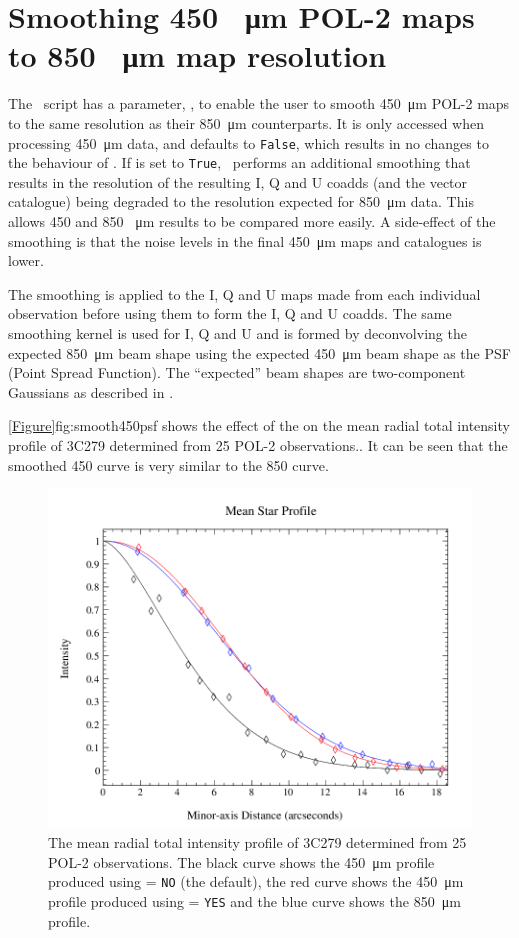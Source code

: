 \section{Smoothing 450 \SI{}{\micro\metre} POL-2 maps to 850 \SI{}{\micro\metre} map resolution}

The \poltwomap\ script has a parameter, , to enable the user to smooth
\SI{450}{\micro\metre} POL-2 maps to the same resolution as their \SI{850}{\micro\metre} counterparts. It is only accessed when processing \SI{450}{\micro\metre} data, and defaults to \texttt{False}, which results in no changes to the behaviour of \poltwomap. If  is set to \texttt{True}, \poltwomap\ performs an additional smoothing that results in the resolution of the resulting I, Q and U coadds (and the vector catalogue) being degraded to the resolution expected for \SI{850}{\micro\metre} data. This allows 450 and 850 \SI{}{\micro\metre} results to be compared more easily. A side-effect of the smoothing is that the noise levels in the final \SI{450}{\micro\metre} maps and catalogues is lower.

The smoothing is applied to the I, Q and U maps made from each individual observation before using them to form the I, Q and U coadds. The same smoothing kernel is used for I, Q and U and is formed by deconvolving the expected \SI{850}{\micro\metre} beam shape using the expected \SI{450}{\micro\metre} beam shape as the PSF (Point Spread Function). The ``expected'' beam shapes are two-component Gaussians as described in \cite{dempsey12}.

\cref{Figure}{fig:smooth450psf}{} shows the effect of the  on the mean radial total intensity profile of 3C279 determined from 25 POL-2 observations.. It can be seen that the smoothed 450 curve is very similar to the 850 curve.

\begin{figure}[ht!]
\begin{center}
\includegraphics[width=0.46\linewidth]{sc22-smooth450-psf-1.png}
\caption [PSF plot showing the effect of the \poltwomap\  parameter.]{
  The mean radial total intensity profile of 3C279 determined from 25 POL-2 observations. The black curve shows the \SI{450}{\micro\metre} profile produced using  = \texttt{NO} (the default), the red curve shows the \SI{450}{\micro\metre} profile produced using  = \texttt{YES} and the blue curve shows the \SI{850}{\micro\metre} profile.
\label{fig:smooth450psf}
}
\end{center}
\end{figure}

